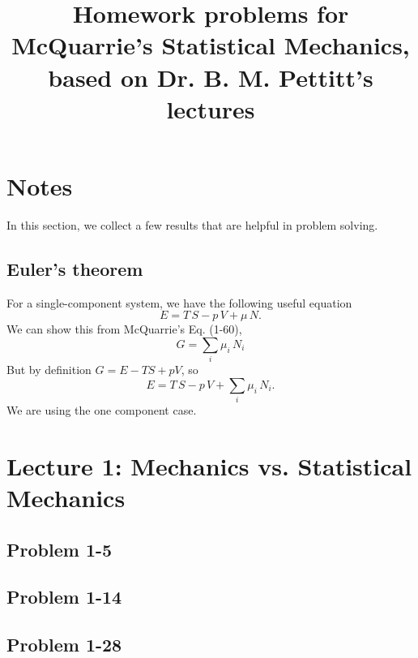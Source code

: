 \documentclass[reprint]{revtex4-1}
\numberwithin{equation}{section}
\begin{document}
\title{Homework problems for McQuarrie's Statistical Mechanics, \\
  based on Dr. B. M. Pettitt's lectures}
\maketitle

\tableofcontents

\section{Notes}

In this section, we collect a few results that are helpful in problem solving.

\subsection{Euler's theorem}

For a single-component system, we have
the following useful equation
\begin{equation}
  E = T \, S - p \, V + \mu \, N.
\label{eq:Euler}
\end{equation}
%
We can show this from McQuarrie's Eq. (1-60),
$$
G = \sum_i \mu_i \, N_i
$$
But by definition $G = E - TS + pV$, so
%
\begin{equation}
  E = T \, S - p \, V + \sum_i \mu_i \, N_i.
\label{eq:Euler_multi}
\end{equation}
%
We are using the one component case.


\section{Lecture 1: Mechanics vs. Statistical Mechanics}

\subsection{Problem 1-5}

\subsection{Problem 1-14}

\subsection{Problem 1-28}
\end{document}
